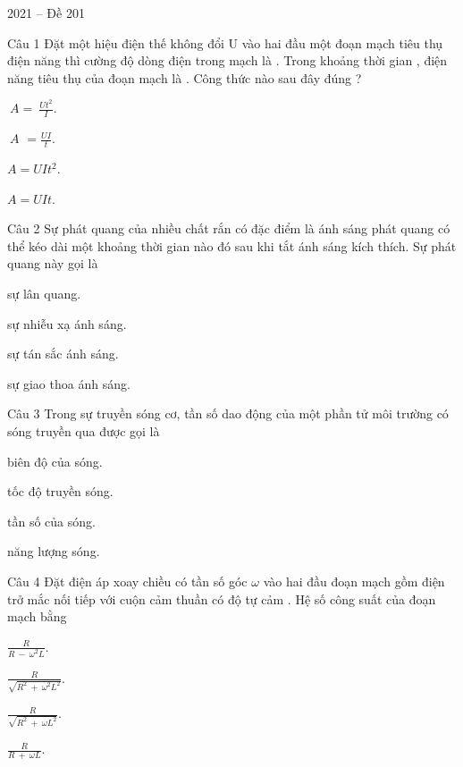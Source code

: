 \documentclass{book}
\begin{document}
\begin{quiz}{2021 – Đề 201}

\begin{multi}[points=1]{Câu 1}
 Đặt một hiệu điện thế không đổi U vào hai đầu một đoạn mạch tiêu thụ điện năng thì cường độ dòng điện trong mạch là . Trong khoảng thời gian , điện năng tiêu thụ của đoạn mạch là . Công thức nào sau đây đúng ?

\item $~A=~\frac{U{{t}^{2}}}{I}.$	
\item $~A$ $=\frac{UI}{t}$.	
\item  $A=UI{{t}^{2}}$.	
\item*  $A=UIt$.
\end{multi}

\begin{multi}[points=1]{Câu 2}
 Sự phát quang của nhiều chất rắn có đặc điểm là ánh sáng phát quang có thể kéo dài một khoảng thời gian nào đó sau khi tắt ánh sáng kích thích. Sự phát quang này gọi là

\item*  sự lân quang.		
\item  sự nhiễu xạ ánh sáng.	
\item  sự tán sắc ánh sáng.		
\item  sự giao thoa ánh sáng.
\end{multi}

\begin{multi}[points=1]{Câu 3}
 Trong sự truyền sóng cơ, tần số dao động của một phần tử môi trường có sóng truyền qua được gọi là

\item  biên độ của sóng.	
\item  tốc độ truyền sóng.	
\item*  tần số của sóng.	
\item  năng lượng sóng.
\end{multi}

\begin{multi}[points=1]{Câu 4}
 Đặt điện áp xoay chiều có tần số góc $\omega $ vào hai đầu đoạn mạch gồm điện trở  mắc nối tiếp với cuộn cảm thuần có độ tự cảm . Hệ số công suất của đoạn mạch bằng

\item  $\frac{R}{R~-~{{\omega }^{2}}L}$.	
\item*  $\frac{R}{\sqrt{{{R}^{2}}~+~{{\omega }^{2}}{{L}^{2}}}}$.	
\item  $\frac{R}{\sqrt{{{R}^{2}}~+~\omega {{L}^{2}}}}$.	
\item  $\frac{R}{R~+~\omega L}$.
\end{multi}


\end{quiz}
\end{document}
